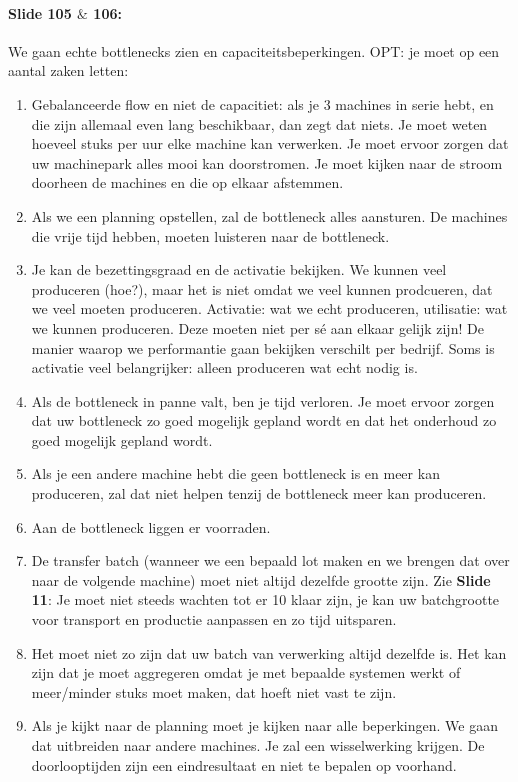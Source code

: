\documentclass[10pt,a4paper]{report}
\begin{document}
\paragraph{Slide 105 $\&$ 106:} We gaan echte bottlenecks zien en capaciteitsbeperkingen.
OPT: je moet op een aantal zaken letten:
\begin{enumerate}
\item Gebalanceerde flow en niet de capacitiet: als je 3 machines in serie hebt, en die zijn allemaal even lang beschikbaar, dan zegt dat niets. Je moet weten hoeveel stuks per uur elke machine kan verwerken. Je moet ervoor zorgen dat uw machinepark alles mooi kan doorstromen. Je moet kijken naar de stroom doorheen de machines en die op elkaar afstemmen.
\item Als we een planning opstellen, zal de bottleneck alles aansturen. De machines die vrije tijd hebben, moeten luisteren naar de bottleneck.
\item Je kan de bezettingsgraad en de activatie bekijken. We kunnen veel produceren (hoe?), maar het is niet omdat we veel kunnen prodcueren, dat we veel moeten produceren. Activatie: wat we echt produceren, utilisatie: wat we kunnen produceren. Deze moeten niet per s\'e aan elkaar gelijk zijn! De manier waarop we performantie gaan bekijken verschilt per bedrijf. Soms is activatie veel belangrijker: alleen produceren wat echt nodig is.
\item Als de bottleneck in panne valt, ben je tijd verloren. Je moet ervoor zorgen dat uw bottleneck zo goed mogelijk gepland wordt en dat het onderhoud zo goed mogelijk gepland wordt.
\item Als je een andere machine hebt die geen bottleneck is en meer kan produceren, zal dat niet helpen tenzij de bottleneck meer kan produceren.
\item Aan de bottleneck liggen er voorraden.
\item De transfer batch (wanneer we een bepaald lot maken en we brengen dat over naar de volgende machine) moet niet altijd dezelfde grootte zijn. Zie \textbf{Slide 11}: Je moet niet steeds wachten tot er 10 klaar zijn, je kan uw batchgrootte voor transport en productie aanpassen en zo tijd uitsparen.
\item Het moet niet zo zijn dat uw batch van verwerking altijd dezelfde is. Het kan zijn dat je moet aggregeren omdat je met bepaalde systemen werkt of meer/minder stuks moet maken, dat hoeft niet vast te zijn.
\item Als je kijkt naar de planning moet je kijken naar alle beperkingen. We gaan dat uitbreiden naar andere machines. Je zal een wisselwerking krijgen. De doorlooptijden zijn een eindresultaat en niet te bepalen op voorhand.
\end{enumerate}
\end{document}
